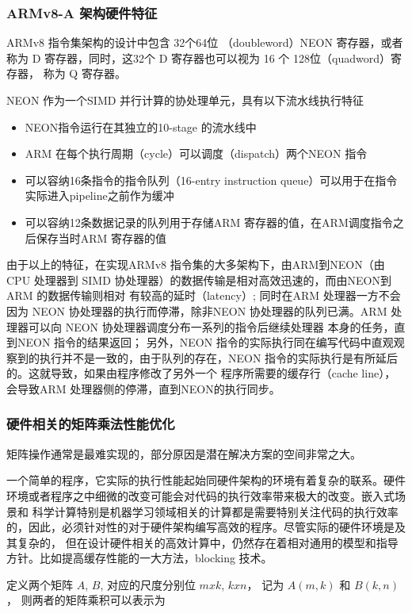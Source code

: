 \subsubsection{ARMv8-A 架构硬件特征}

ARMv8 指令集架构的设计中包含 32个64位 （doubleword）NEON 寄存器，或者称为 D 寄存器，同时，这32个 D 寄存器也可以视为 16 个 128位（quadword）寄存器，
称为 Q 寄存器。

NEON 作为一个SIMD 并行计算的协处理单元，具有以下流水线执行特征
\begin{itemize}
\item NEON指令运行在其独立的10-stage 的流水线中
\item ARM 在每个执行周期（cycle）可以调度（dispatch）两个NEON 指令
\item 可以容纳16条指令的指令队列（16-entry instruction queue）可以用于在指令实际进入pipeline之前作为缓冲
\item 可以容纳12条数据记录的队列用于存储ARM 寄存器的值，在ARM调度指令之后保存当时ARM 寄存器的值
\end{itemize}

由于以上的特征，在实现ARMv8 指令集的大多架构下，由ARM到NEON（由CPU 处理器到 SIMD 协处理器）的数据传输是相对高效迅速的，而由NEON到ARM 的数据传输则相对
有较高的延时（latency）;
同时在ARM 处理器一方不会因为 NEON 协处理器的执行而停滞，除非NEON 协处理器的队列已满。ARM 处理器可以向 NEON 协处理器调度分布一系列的指令后继续处理器
本身的任务，直到NEON 指令的结果返回；
另外，NEON 指令的实际执行同在编写代码中直观观察到的执行并不是一致的，由于队列的存在，NEON 指令的实际执行是有所延后的。这就导致，如果由程序修改了另外一个
程序所需要的缓存行（cache line），会导致ARM 处理器侧的停滞，直到NEON的执行同步。

\subsubsection{硬件相关的矩阵乘法性能优化}
矩阵操作通常是最难实现的，部分原因是潜在解决方案的空间非常之大。 

一个简单的程序，它实际的执行性能起始同硬件架构的环境有着复杂的联系。硬件环境或者程序之中细微的改变可能会对代码的执行效率带来极大的改变。嵌入式场景和
科学计算特别是机器学习领域相关的计算都是需要特别关注代码的执行效率的，因此，必须针对性的对于硬件架构编写高效的程序。尽管实际的硬件环境是及其复杂的，
但在设计硬件相关的高效计算中，仍然存在着相对通用的模型和指导方针。比如提高缓存性能的一大方法，blocking 技术。

定义两个矩阵 $A$, $B$, 对应的尺度分别位 $m x k$, $k x n$， 记为 $A(m, k) $ 和 $ B(k, n) $， 则两者的矩阵乘积可以表示为


